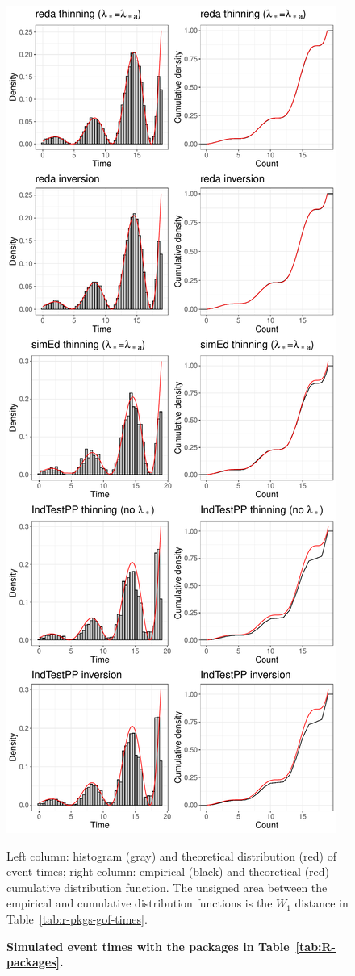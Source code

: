 \documentclass[article,nojss]{jss}\usepackage[]{graphicx}\usepackage[]{xcolor}
\makeatletter
\def\maxwidth{ %
  \ifdim\Gin@nat@width>\linewidth
    \linewidth
  \else
    \Gin@nat@width
  \fi
}
\makeatother
\begin{document}
\begin{figure}[H]
\caption{{\bf Simulated event times with the  packages in Table~\ref{tab:R-packages}.}}\label{fig:epdf-r-pkgs-times}
{\centering \includegraphics[width=\maxwidth,height=\textheight,keepaspectratio=true]{figure/epdf-r-pkgs-times-1.pdf} 
}
\begin{flushleft}
Left column: histogram (gray) and theoretical distribution (red) of event times; right column: empirical (black) and theoretical (red) cumulative distribution function. The unsigned area between the empirical and cumulative distribution functions is the $W_1$ distance in Table~\ref{tab:r-pkgs-gof-times}.
\end{flushleft}
\end{figure}
\end{document}
